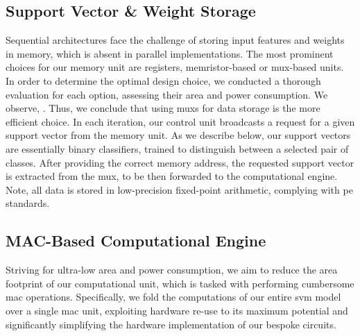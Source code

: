 \subsection{Support Vector \& Weight Storage}
\label{sec:memory}
Sequential architectures face the challenge of storing input features and weights in memory, which is absent in parallel implementations.
The most prominent choices for our memory unit are registers, memristor-based  or \gls{mux}-based units.
In order to determine the optimal design choice, we conducted a thorough evaluation for each option, assessing their area and power consumption.
We observe, .
Thus, we conclude that using \glspl{mux} for data storage is the more efficient choice.
In each iteration, our control unit broadcasts a request for a given support vector from the memory unit.
As we describe below, our support vectors are essentially binary classifiers, trained to distinguish between a selected pair of classes.
After providing the correct memory address, the requested support vector is extracted from the \gls{mux}, to be then forwarded to the computational engine.
Note, all data is stored in low-precision fixed-point arithmetic, complying with \gls{pe} standards.




\subsection{MAC-Based Computational Engine}
\label{sec:compute}
Striving for ultra-low area and power consumption, we aim to reduce the area footprint of our computational unit, which is tasked with performing cumbersome \gls{mac} operations.
Specifically, we fold the computations of our entire \gls{svm} model over a single \gls{mac} unit, exploiting hardware re-use to its maximum potential and significantly simplifying the hardware implementation of our bespoke circuits.

